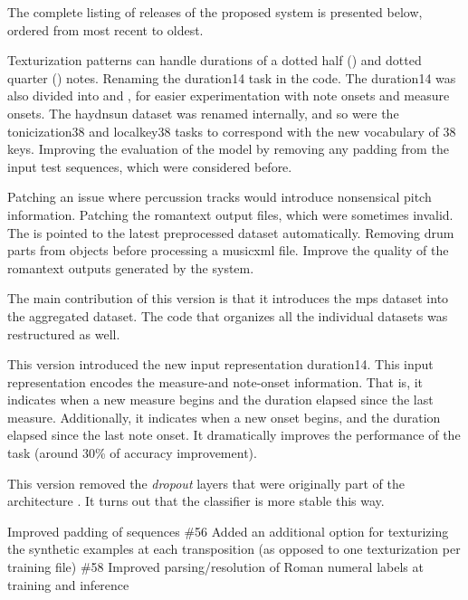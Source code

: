 The complete listing of releases of the proposed system is
presented below, ordered from most recent to oldest.

Texturization patterns can handle durations of a dotted half
(\musHalfDotted) and dotted quarter (\musQuarterDotted)
notes. Renaming the \gls{duration14} task in the code. The
\gls{duration14} was also divided into 
and , for easier experimentation with note
onsets and measure onsets. The \gls{haydnsun} dataset was
renamed internally, and so were the \gls{tonicization38} and
\gls{localkey38} tasks to correspond with the new vocabulary
of 38 keys. Improving the evaluation of the model by
removing any padding from the input test sequences, which
were considered before.

Patching an issue where percussion tracks would introduce
nonsensical pitch information. Patching the \gls{romantext}
output files, which were sometimes invalid. The
 is pointed to the latest preprocessed dataset
automatically. Removing drum parts from
 objects before processing a
\gls{musicxml} file. Improve the quality of the
\gls{romantext} outputs generated by the system.

The main contribution of this version is that it introduces
the \gls{mps} dataset into the aggregated dataset. The code
that organizes all the individual datasets was restructured
as well. 

This version introduced the new input representation
\gls{duration14}. This input representation encodes the
measure-and note-onset information. That is, it indicates
when a new measure begins and the duration elapsed since the
last measure. Additionally, it indicates when a new onset
begins, and the duration elapsed since the last note onset.
It dramatically improves the performance of the
 task (around 30\% of accuracy
improvement).

This version removed the \emph{dropout} layers that were
originally part of the architecture . It turns out that the
 classifier is more stable this way.

Improved padding of sequences \#56 Added an additional
option for texturizing the synthetic examples at each
transposition (as opposed to one texturization per training
file) \#58 Improved parsing/resolution of Roman numeral
labels at training and inference

